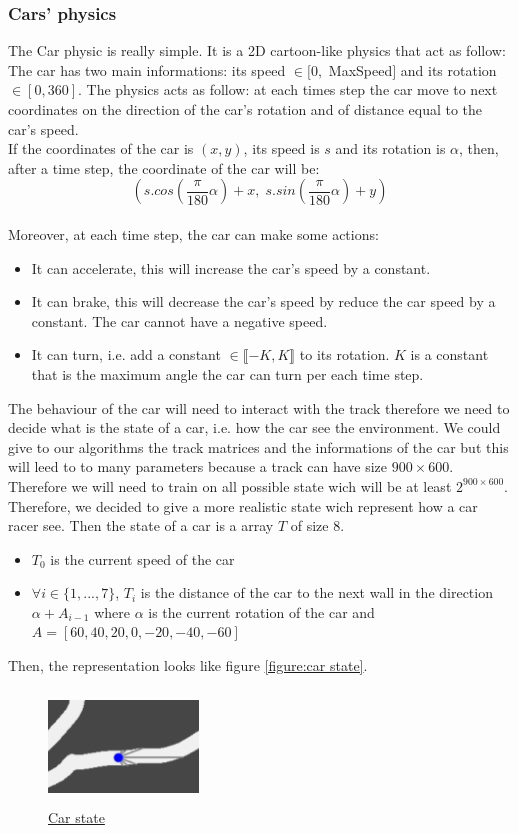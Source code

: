 \documentclass[11pt,a4paper]{article}
\newcounter{fig}
\newcommand{\mlist}[1]{\begin{itemize}[noitemsep,topsep=0pt]#1\end{itemize}}
\begin{document}
			\subsubsection*{Cars' physics}
The Car physic is really simple. It is a 2D cartoon-like physics that act as follow:\\
The car has two main informations: its speed $\in [0,$ MaxSpeed$]$ and its rotation $\in [0,360]$. The physics acts as follow: at each times step the car move to next coordinates on the direction of the car's rotation and of distance equal to the car's speed.\\
If the coordinates of the car is $(x,y)$, its speed is $s$ and its rotation is $\alpha$, then, after a time step, the coordinate of the car will be:
\[(s.cos(\frac{\pi}{180}\alpha) + x,\; s.sin(\frac{\pi}{180}\alpha) + y)\]
\\
Moreover, at each time step, the car can make some actions:
\mlist{
\item It can accelerate, this will increase the car's speed by a constant.
\item It can brake, this will decrease the car's speed by reduce the car speed by a constant. The car cannot have a negative speed.
\item It can turn, i.e. add a constant $\in \llbracket-K,K\rrbracket$ to its rotation. $K$ is a constant that is the maximum angle the car can turn per each time step.
}
The behaviour of the car will need to interact with the track therefore we need to decide what is the state of a car, i.e. how the car see the environment. We could give to our algorithms the track matrices and the informations of the car but this will leed to to many parameters because a track can have size $900\times600$. Therefore we will need to train on all possible state wich will be at least $2^{900\times 600}$. Therefore, we decided to give a more realistic state wich represent how a car racer see. Then the state of a car is a array $T$ of size $8$.
\mlist{
\item $T_0$ is the current speed of the car
\item $\forall i\in\{1,...,7\}$, $T_i$ is the distance of the car to the next wall in the direction $\alpha + A_{i-1}$ where $\alpha$ is the current rotation of the car and $A=[60, 40, 20, 0, -20, -40, -60]$
}
Then, the representation looks like figure \ref{figure:car state}.
\begin{center}
\label{figure:car state}
	\begin{figure}[ht]
		\centering
		\includegraphics[width=4cm, height=3cm]{car_state.png}
		\caption{\underline{Car state}}
	\end{figure}
\end{center}
		
\end{document}
